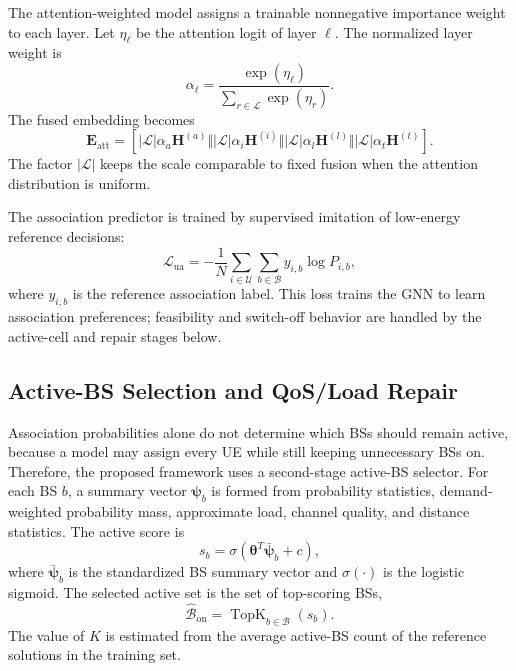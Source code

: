 \documentclass[journal]{IEEEtran}
\begin{document}
The attention-weighted model assigns a trainable nonnegative importance weight
to each layer. Let $\eta_{\ell}$ be the attention logit of layer $\ell$. The
normalized layer weight is
\begin{equation}
    \alpha_{\ell} =
    \frac{\exp(\eta_{\ell})}
    {\sum_{r\in\mathcal{L}}\exp(\eta_r)}.
    \label{eq:attention_weight}
\end{equation}
The fused embedding becomes
\begin{equation}
    \mathbf{E}_{\mathrm{att}} =
    \left[|\mathcal{L}|\alpha_a\mathbf{H}^{(a)}
    \Vert |\mathcal{L}|\alpha_i\mathbf{H}^{(i)}
    \Vert |\mathcal{L}|\alpha_l\mathbf{H}^{(l)}
    \Vert |\mathcal{L}|\alpha_t\mathbf{H}^{(t)}\right].
    \label{eq:att_fusion}
\end{equation}
The factor $|\mathcal{L}|$ keeps the scale comparable to fixed fusion when the
attention distribution is uniform.

The association predictor is trained by supervised imitation of low-energy
reference decisions:
\begin{equation}
    \mathcal{L}_{\mathrm{ua}} =
    -\frac{1}{N}\sum_{i\in\mathcal{U}}
    \sum_{b\in\mathcal{B}} y_{i,b}\log P_{i,b},
    \label{eq:ua_loss}
\end{equation}
where $y_{i,b}$ is the reference association label. This loss trains the GNN to
learn association preferences; feasibility and switch-off behavior are handled
by the active-cell and repair stages below.

\subsection{Active-BS Selection and QoS/Load Repair}
Association probabilities alone do not determine which BSs should remain
active, because a model may assign every UE while still keeping unnecessary BSs
on. Therefore, the proposed framework uses a second-stage active-BS selector.
For each BS $b$, a summary vector $\boldsymbol{\psi}_b$ is formed from
probability statistics, demand-weighted probability mass, approximate load,
channel quality, and distance statistics. The active score is
\begin{equation}
    s_b = \sigma\left(\boldsymbol{\theta}^{T}
    \bar{\boldsymbol{\psi}}_b + c\right),
    \label{eq:active_score}
\end{equation}
where $\bar{\boldsymbol{\psi}}_b$ is the standardized BS summary vector and
$\sigma(\cdot)$ is the logistic sigmoid. The selected active set is the set of
top-scoring BSs,
\begin{equation}
    \widehat{\mathcal{B}}_{\mathrm{on}}
    = \operatorname{TopK}_{b\in\mathcal{B}}(s_b).
    \label{eq:topk}
\end{equation}
The value of $K$ is estimated from the average active-BS count of the reference
solutions in the training set.
\end{document}
